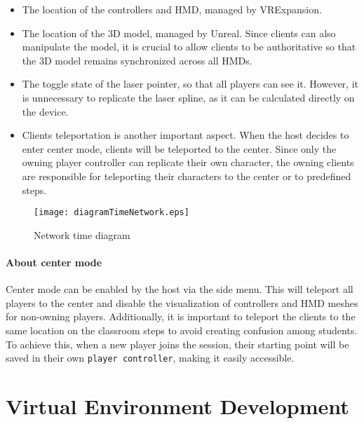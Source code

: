 \begin{itemize}
    \item The location of the controllers and \ac{HMD}, managed by VRExpansion.
    \item The location of the 3D model, managed by Unreal. Since clients can also manipulate the model, it is crucial to allow clients to be authoritative so that the 3D model remains synchronized across all \ac{HMD}s.
    \item The toggle state of the laser pointer, so that all players can see it. However, it is unnecessary to replicate the laser spline, as it can be calculated directly on the device.
    \item Clients teleportation is another important aspect. When the host decides to enter center mode, clients will be teleported to the center. Since only the owning player controller can replicate their own character, the owning clients are responsible for teleporting their characters to the center or to predefined steps.
\end{itemize}


\begin{figure}[h]
    \texttt{[image: diagramTimeNetwork.eps]}
    \caption{Network time diagram}
    \label{fig:networkTime}
\end{figure}

\paragraph{About center mode}
Center mode can be enabled by the host via the side menu. This will teleport all players to the center and disable the visualization of controllers and \ac{HMD} meshes for non-owning players. Additionally, it is important to teleport the clients to the same location on the classroom steps to avoid creating confusion among students.
To achieve this, when a new player joins the session, their starting point will be saved in their own \texttt{player controller}, making it easily accessible.


\section{Virtual Environment Development}
